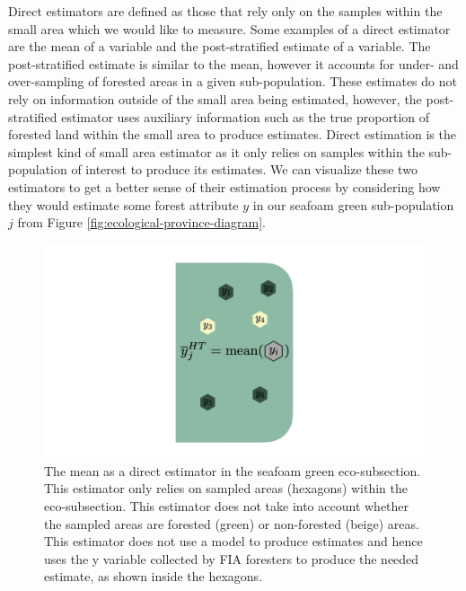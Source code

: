 \documentclass[12pt,twoside]{reedthesis}
\begin{document}
Direct estimators are defined as those that rely only on the samples within the small area which we would like to measure. Some examples of a direct estimator are the mean of a variable and the post-stratified estimate of a variable. The post-stratified estimate is similar to the mean, however it accounts for under- and over-sampling of forested areas in a given sub-population. These estimates do not rely on information outside of the small area being estimated, however, the post-stratified estimator uses auxiliary information such as the true proportion of forested land within the small area to produce estimates. Direct estimation is the simplest kind of small area estimator as it only relies on samples within the sub-population of interest to produce its estimates. We can visualize these two estimators to get a better sense of their estimation process by considering how they would estimate some forest attribute \(y\) in our seafoam green sub-population \(j\) from Figure \ref{fig:ecological-province-diagram}.
\begin{figure}

{\centering \includegraphics[width=1\linewidth]{figure/mean-diagram} 

}

\caption[The mean as a direct estimator]{The mean as a direct estimator in the seafoam green eco-subsection. This estimator only relies on sampled areas (hexagons) within the eco-subsection. This estimator does not take into account whether the sampled areas are forested (green) or non-forested (beige) areas. This estimator does not use a model to produce estimates and hence uses the y variable collected by FIA foresters to produce the needed estimate, as shown inside the hexagons.}\label{fig:mean-diagram}
\end{figure}
\end{document}
